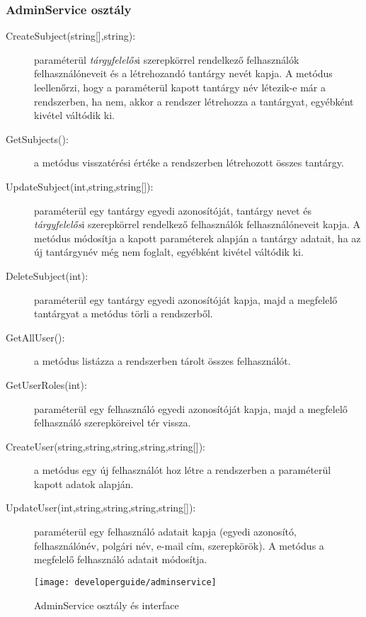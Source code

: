 \subsubsection{AdminService osztály}
\begin{description}
	\item[CreateSubject(string{[]},string):] paraméterül \emph{tárgyfelelős}i szerepkörrel rendelkező felhasználók felhasználóneveit és a létrehozandó tantárgy nevét kapja. A metódus leellenőrzi, hogy a paraméterül kapott tantárgy név létezik-e már a rendszerben, ha nem, akkor a rendszer létrehozza a tantárgyat, egyébként kivétel váltódik ki.
	\item[GetSubjects():] a metódus visszatérési értéke a rendszerben létrehozott összes tantárgy.
	\item[UpdateSubject(int,string,string{[]}):] paraméterül egy tantárgy egyedi azonosítóját, tantárgy nevet és \emph{tárgyfelelős}i szerepkörrel rendelkező felhasználók felhasználóneveit kapja. A metódus módosítja a kapott paraméterek alapján a tantárgy adatait, ha az új tantárgynév még nem foglalt, egyébként kivétel váltódik ki.
	\item[DeleteSubject(int):] paraméterül egy tantárgy egyedi azonosítóját kapja, majd a megfelelő tantárgyat a metódus törli a rendszerből.
	\item[GetAllUser():] a metódus listázza a rendszerben tárolt összes felhasználót.
	\item[GetUserRoles(int):] paraméterül egy felhasználó egyedi azonosítóját kapja, majd a megfelelő felhasználó szerepköreivel tér vissza.
	\item[CreateUser(string,string,string,string,string{[]}):] a metódus egy új felhasználót hoz létre a rendszerben a paraméterül kapott adatok alapján.
	\item[UpdateUser(int,string,string,string,string{[]}):] paraméterül egy felhasználó adatait kapja (egyedi azonosító, felhasználónév, polgári név, e-mail cím, szerepkörök). A metódus a megfelelő felhasználó adatait módosítja.
\end{description}
\begin{figure}[H]
	\centering
	\texttt{[image: developerguide/adminservice]}
	\caption{AdminService osztály és interface}
	\label{fig:bll-adminservice}
\end{figure}
